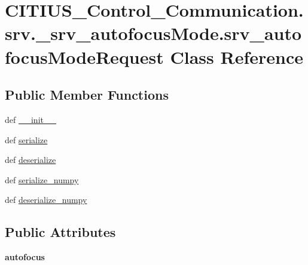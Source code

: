 \hypertarget{class_c_i_t_i_u_s___control___communication_1_1srv_1_1__srv__autofocus_mode_1_1srv__autofocus_mode_request}{\section{\-C\-I\-T\-I\-U\-S\-\_\-\-Control\-\_\-\-Communication.\-srv.\-\_\-srv\-\_\-autofocus\-Mode.\-srv\-\_\-autofocus\-Mode\-Request \-Class \-Reference}
\label{class_c_i_t_i_u_s___control___communication_1_1srv_1_1__srv__autofocus_mode_1_1srv__autofocus_mode_request}
}
\subsection*{\-Public \-Member \-Functions}
\begin{DoxyCompactItemize}
\item 
def \hyperlink{class_c_i_t_i_u_s___control___communication_1_1srv_1_1__srv__autofocus_mode_1_1srv__autofocus_mode_request_aa4292e8dc48450474918231ab17b0d80}{\-\_\-\-\_\-init\-\_\-\-\_\-}
\item 
def \hyperlink{class_c_i_t_i_u_s___control___communication_1_1srv_1_1__srv__autofocus_mode_1_1srv__autofocus_mode_request_ae7081c575364c25b29e6517096d1e911}{serialize}
\item 
def \hyperlink{class_c_i_t_i_u_s___control___communication_1_1srv_1_1__srv__autofocus_mode_1_1srv__autofocus_mode_request_a8426434208bac26dd175d68412446634}{deserialize}
\item 
def \hyperlink{class_c_i_t_i_u_s___control___communication_1_1srv_1_1__srv__autofocus_mode_1_1srv__autofocus_mode_request_af94ec04d6b5421b2baab0121f0aa19e9}{serialize\-\_\-numpy}
\item 
def \hyperlink{class_c_i_t_i_u_s___control___communication_1_1srv_1_1__srv__autofocus_mode_1_1srv__autofocus_mode_request_a22c502a635a343779cf244dffccbe0b7}{deserialize\-\_\-numpy}
\end{DoxyCompactItemize}
\subsection*{\-Public \-Attributes}
\begin{DoxyCompactItemize}
\item 
\hypertarget{class_c_i_t_i_u_s___control___communication_1_1srv_1_1__srv__autofocus_mode_1_1srv__autofocus_mode_request_aa14049109ef36d576fb291baea33ea64}{{\bfseries autofocus}}\label{class_c_i_t_i_u_s___control___communication_1_1srv_1_1__srv__autofocus_mode_1_1srv__autofocus_mode_request_aa14049109ef36d576fb291baea33ea64}

\end{DoxyCompactItemize}
